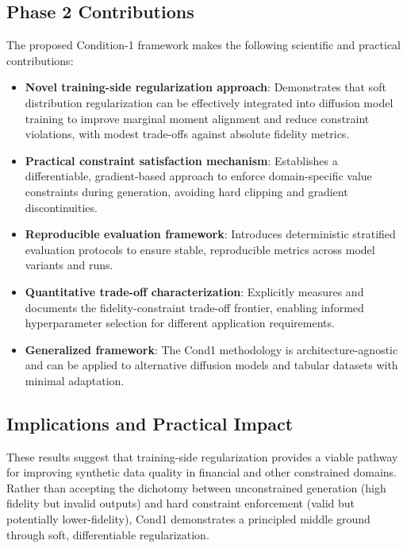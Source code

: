 \documentclass[10pt,conference,a4paper]{IEEEtran}
\begin{document}
\subsection{Phase 2 Contributions}
The proposed Condition-1 framework makes the following scientific and practical contributions:

\begin{itemize}
    \item \textbf{Novel training-side regularization approach}: Demonstrates that soft distribution regularization can be effectively integrated into diffusion model training to improve marginal moment alignment and reduce constraint violations, with modest trade-offs against absolute fidelity metrics.
    
    \item \textbf{Practical constraint satisfaction mechanism}: Establishes a differentiable, gradient-based approach to enforce domain-specific value constraints during generation, avoiding hard clipping and gradient discontinuities.
    
    \item \textbf{Reproducible evaluation framework}: Introduces deterministic stratified evaluation protocols to ensure stable, reproducible metrics across model variants and runs.
    
    \item \textbf{Quantitative trade-off characterization}: Explicitly measures and documents the fidelity-constraint trade-off frontier, enabling informed hyperparameter selection for different application requirements.
    
    \item \textbf{Generalized framework}: The Cond1 methodology is architecture-agnostic and can be applied to alternative diffusion models and tabular datasets with minimal adaptation.
\end{itemize}

\subsection{Implications and Practical Impact}
These results suggest that training-side regularization provides a viable pathway for improving synthetic data quality in financial and other constrained domains. Rather than accepting the dichotomy between unconstrained generation (high fidelity but invalid outputs) and hard constraint enforcement (valid but potentially lower-fidelity), Cond1 demonstrates a principled middle ground through soft, differentiable regularization.
\end{document}
